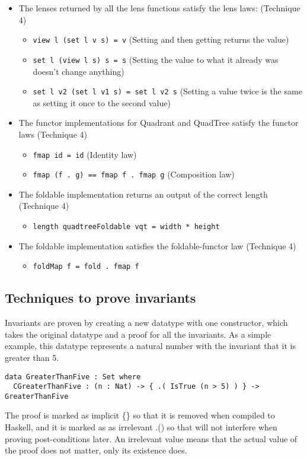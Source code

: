 \begin{itemize}
    \item The lenses returned by all the lens functions satisfy the lens laws: \cite{lens} (Technique 4)
        \begin{itemize}
            \item \verb|view l (set l v s) = v| (Setting and then getting returns the value)
            \item \verb|set l (view l s) s = s| (Setting the value to what it already was doesn't change anything)
            \item \verb|set l v2 (set l v1 s) = set l v2 s| (Setting a value twice is the same as setting it once to the second value)
        \end{itemize}
    \item The functor implementations for Quadrant and QuadTree satisfy the functor laws (Technique 4)
        \begin{itemize}
            \item \verb|fmap id = id| (Identity law)
            \item \verb|fmap (f . g) == fmap f . fmap g| (Composition law)
        \end{itemize}
    \item The foldable implementation returns an output of the correct length (Technique 4)
        \begin{itemize}
            \item \verb|length quadtreeFoldable vqt = width * height|
        \end{itemize}
    \item The foldable implementation satisfies the foldable-functor law (Technique 4)
        \begin{itemize}
            \item \verb|foldMap f = fold . fmap f|
        \end{itemize}
\end{itemize}

\subsection{Techniques to prove invariants} \label{prove_invariants}
Invariants are proven by creating a new datatype with one constructor, which takes the original datatype and a proof for all the invariants. As a simple example, this datatype represents a natural number with the invariant that it is greater than 5.
\begin{verbatim}
data GreaterThanFive : Set where
  CGreaterThanFive : (n : Nat) -> { .( IsTrue (n > 5) ) } -> GreaterThanFive
\end{verbatim}
The proof is marked as implicit \{\} so that it is removed when compiled to Haskell, and it is marked as as irrelevant .() so that will not interfere when proving post-conditions later. An irrelevant value means that the actual value of the proof does not matter, only its existence does.

